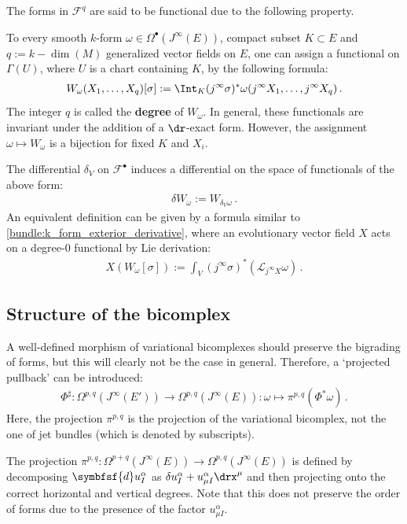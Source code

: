     The forms in $\mathcal{F}^q$ are said to be functional due to the following property.
    \begin{property}[Functionals]\label{var:functionals}
        To every smooth $k$-form $\omega\in\Omega^\bullet(J^\infty(E))$, compact subset $K\subset E$ and $q:=k-\dim(M)$ generalized vector fields on $E$, one can assign a functional on $\Gamma(U)$, where $U$ is a chart containing $K$, by the following formula:
        \begin{gather}
            W_\omega(X_1,\ldots,X_q)[\sigma] := \Int_K(j^\infty\sigma)^*\omega(j^\infty X_1,\ldots,j^\infty X_q)\,.
        \end{gather}
        The integer $q$ is called the \textbf{degree} of $W_\omega$. In general, these functionals are invariant under the addition of a $\dr$-exact form. However, the assignment $\omega\mapsto W_\omega$ is a bijection for fixed $K$ and $X_i$.
    \end{property}
    \begin{construct}
        The differential $\delta_V$ on $\mathcal{F}^\bullet$ induces a differential on the space of functionals of the above form:
        \begin{gather}
            \delta W_\omega := W_{\delta_V\omega}\,.
        \end{gather}
        An equivalent definition can be given by a formula similar to \cref{bundle:k_form_exterior_derivative}, where an evolutionary vector field $X$ acts on a degree-$0$ functional by Lie derivation:
        \begin{gather}
            X(W_\omega[\sigma]) := \int_V(j^\infty\sigma)^*(\mathcal{L}_{j^\infty X}\omega)\,.
        \end{gather}
    \end{construct}

\subsection{Structure of the bicomplex}

    A well-defined morphism of variational bicomplexes should preserve the bigrading of forms, but this will clearly not be the case in general. Therefore, a `projected pullback' can be introduced:
    \begin{gather}
        \Phi^\sharp:\Omega^{p,q}(J^\infty(E'))\rightarrow\Omega^{p,q}(J^\infty(E)):\omega\mapsto\pi^{p,q}(\Phi^*\omega)\,.
    \end{gather}
    Here, the projection $\pi^{p,q}$ is the projection of the variational bicomplex, not the one of jet bundles (which is denoted by subscripts).
    \begin{remark}\label{var:degree_raise_remark}
        The projection $\pi^{p,q}:\Omega^{p+q}(J^\infty(E))\rightarrow\Omega^{p,q}(J^\infty(E))$ is defined by decomposing $\symbfsf{d}u^\alpha_I$ as $\delta u^\alpha_I + u^\alpha_{\mu I}\drx^\mu$ and then projecting onto the correct horizontal and vertical degrees. Note that this does not preserve the order of forms due to the presence of the factor $u^\alpha_{\mu I}$.
    \end{remark}

